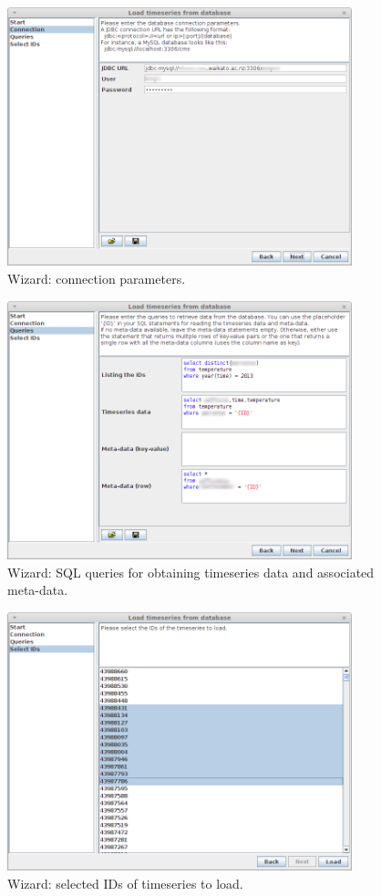 \documentclass[a4paper]{book}
\begin{document}
\begin{figure}[htb]
  \centering
  \includegraphics[width=10.0cm]{images/timeseries_db_wizard_2.png}
  \caption{Wizard: connection parameters.}
  \label{timeseries_db_wizard_2}
\end{figure}

\begin{figure}[htb]
  \centering
  \includegraphics[width=10.0cm]{images/timeseries_db_wizard_3.png}
  \caption{Wizard: SQL queries for obtaining timeseries data and associated meta-data.}
  \label{timeseries_db_wizard_3}
\end{figure}

\begin{figure}[htb]
  \centering
  \includegraphics[width=10.0cm]{images/timeseries_db_wizard_4.png}
  \caption{Wizard: selected IDs of timeseries to load.}
  \label{timeseries_db_wizard_4}
\end{figure}
\end{document}
